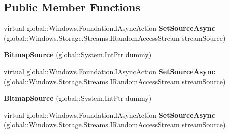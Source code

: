\subsection*{Public Member Functions}
\begin{DoxyCompactItemize}
\item 
\mbox{\label{class_windows_1_1_u_i_1_1_xaml_1_1_media_1_1_imaging_1_1_bitmap_source_a818786602156a66e4e78b9865d101d4e}} 
virtual global\+::\+Windows.\+Foundation.\+I\+Async\+Action {\bfseries Set\+Source\+Async} (global\+::\+Windows.\+Storage.\+Streams.\+I\+Random\+Access\+Stream stream\+Source)
\item 
\mbox{\label{class_windows_1_1_u_i_1_1_xaml_1_1_media_1_1_imaging_1_1_bitmap_source_a78daced3d43d96a2659f0a100105fa82}} 
{\bfseries Bitmap\+Source} (global\+::\+System.\+Int\+Ptr dummy)
\item 
\mbox{\label{class_windows_1_1_u_i_1_1_xaml_1_1_media_1_1_imaging_1_1_bitmap_source_a818786602156a66e4e78b9865d101d4e}} 
virtual global\+::\+Windows.\+Foundation.\+I\+Async\+Action {\bfseries Set\+Source\+Async} (global\+::\+Windows.\+Storage.\+Streams.\+I\+Random\+Access\+Stream stream\+Source)
\item 
\mbox{\label{class_windows_1_1_u_i_1_1_xaml_1_1_media_1_1_imaging_1_1_bitmap_source_a78daced3d43d96a2659f0a100105fa82}} 
{\bfseries Bitmap\+Source} (global\+::\+System.\+Int\+Ptr dummy)
\item 
\mbox{\label{class_windows_1_1_u_i_1_1_xaml_1_1_media_1_1_imaging_1_1_bitmap_source_a818786602156a66e4e78b9865d101d4e}} 
virtual global\+::\+Windows.\+Foundation.\+I\+Async\+Action {\bfseries Set\+Source\+Async} (global\+::\+Windows.\+Storage.\+Streams.\+I\+Random\+Access\+Stream stream\+Source)
\item 
\mbox{\label{class_windows_1_1_u_i_1_1_xaml_1_1_media_1_1_imaging_1_1_bitmap_source_a78daced3d43d96a2659f0a100105fa82}} 

\end{DoxyCompactItemize}
